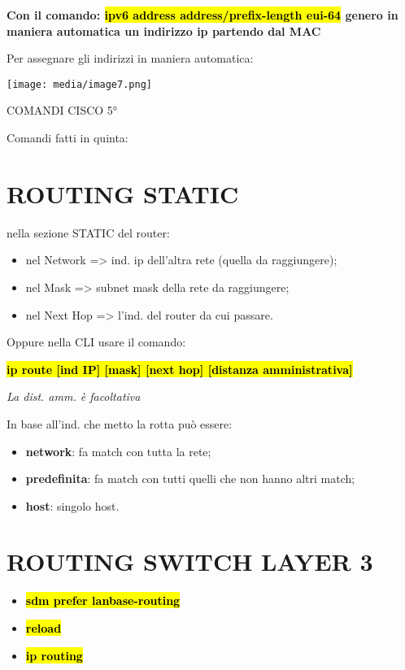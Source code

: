 \textbf{Con il comando: \hl{ipv6 address address/prefix-length eui-64}
genero in maniera automatica un indirizzo ip partendo dal MAC}

Per assegnare gli indirizzi in maniera automatica:

\texttt{[image: media/image7.png]}

COMANDI CISCO 5°

Comandi fatti in quinta:

\section{ROUTING STATIC}\label{routing-static}

nella sezione STATIC del router:

\begin{itemize}
\item
  nel Network =\textgreater{} ind. ip dell'altra rete (quella da
  raggiungere);
\item
  nel Mask =\textgreater{} subnet mask della rete da raggiungere;
\item
  nel Next Hop =\textgreater{} l'ind. del router da cui passare.
\end{itemize}

Oppure nella CLI usare il comando:

\textbf{\hl{ip route {[}ind IP{]} {[}mask{]} {[}next hop{]} {[}distanza
amministrativa{]}}}

\emph{La dist. amm. è facoltativa}

In base all'ind. che metto la rotta può essere:

\begin{itemize}
\item
  \textbf{network}: fa match con tutta la rete;
\item
  \textbf{predefinita}: fa match con tutti quelli che non hanno altri
  match;
\item
  \textbf{host}: singolo host.
\end{itemize}

\section{ROUTING SWITCH LAYER 3}\label{routing-switch-layer-3}

\begin{itemize}
\item
  \textbf{\hl{sdm prefer lanbase-routing}}
\item
  \textbf{\hl{reload}}
\item
  \textbf{\hl{ip routing}}
\end{itemize}


